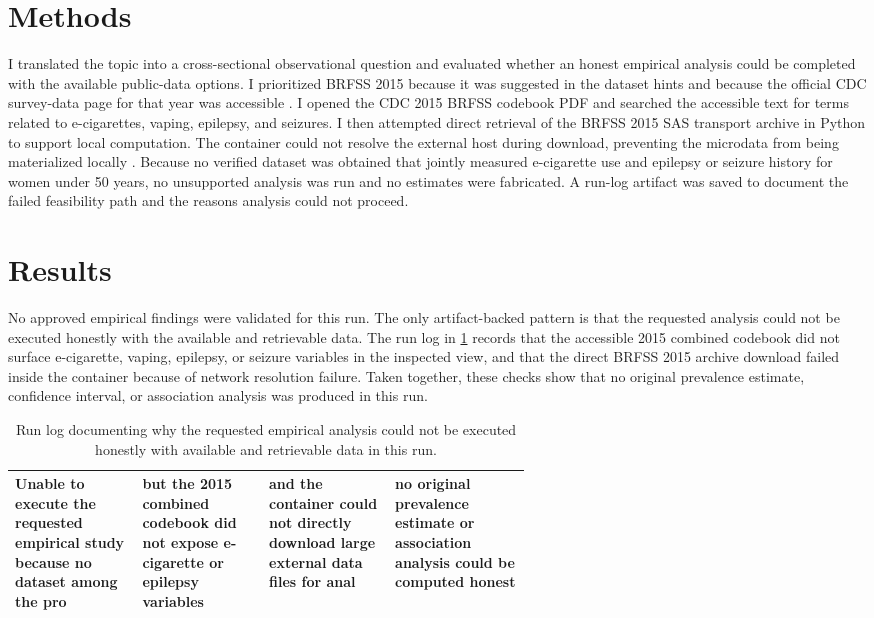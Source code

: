 \documentclass[11pt]{article}
\begin{document}
\section{Methods}
I translated the topic into a cross-sectional observational question and evaluated whether an honest empirical analysis could be completed with the available public-data options. I prioritized BRFSS 2015 because it was suggested in the dataset hints and because the official CDC survey-data page for that year was accessible \cite{ref1}. I opened the CDC 2015 BRFSS codebook PDF and searched the accessible text for terms related to e-cigarettes, vaping, epilepsy, and seizures. I then attempted direct retrieval of the BRFSS 2015 SAS transport archive in Python to support local computation. The container could not resolve the external host during download, preventing the microdata from being materialized locally \cite{ref2} \cite{ref3}. Because no verified dataset was obtained that jointly measured e-cigarette use and epilepsy or seizure history for women under 50 years, no unsupported analysis was run and no estimates were fabricated. A run-log artifact was saved to document the failed feasibility path and the reasons analysis could not proceed.

\section{Results}
No approved empirical findings were validated for this run. The only artifact-backed pattern is that the requested analysis could not be executed honestly with the available and retrievable data. The run log in \ref{tab:artifact-1} records that the accessible 2015 combined codebook did not surface e-cigarette, vaping, epilepsy, or seizure variables in the inspected view, and that the direct BRFSS 2015 archive download failed inside the container because of network resolution failure. Taken together, these checks show that no original prevalence estimate, confidence interval, or association analysis was produced in this run.

\begin{table}[tbp]
\centering
\caption{Run log documenting why the requested empirical analysis could not be executed honestly with available and retrievable data in this run.}
\label{tab:artifact-1}
\begin{tabular}{>{\raggedright\arraybackslash}p{0.15\linewidth}>{\raggedright\arraybackslash}p{0.15\linewidth}>{\raggedright\arraybackslash}p{0.15\linewidth}>{\raggedright\arraybackslash}p{0.15\linewidth}}
\toprule
Unable to execute the requested empirical study because no dataset among the pro & but the 2015 combined codebook did not expose e-cigarette or epilepsy variables  & and the container could not directly download large external data files for anal & no original prevalence estimate or association analysis could be computed honest \\
\midrule
\bottomrule
\end{tabular}
\end{table}
\end{document}
